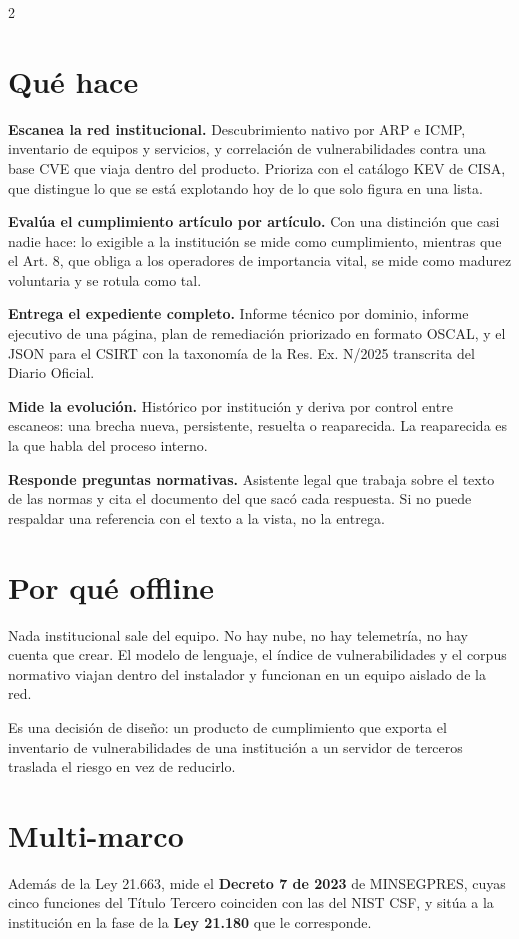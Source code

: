 \documentclass[10pt,a4paper]{article}
\begin{document}
\begin{multicols}{2}

\section{Qué hace}

\textbf{Escanea la red institucional.} Descubrimiento nativo por ARP e ICMP, inventario de
equipos y servicios, y correlación de vulnerabilidades contra una base CVE que viaja dentro
del producto. Prioriza con el catálogo KEV de CISA, que distingue lo que se está explotando
hoy de lo que solo figura en una lista.

\textbf{Evalúa el cumplimiento artículo por artículo.} Con una distinción que casi nadie
hace: lo exigible a la institución se mide como cumplimiento, mientras que el
Art. 8\textdegree, que obliga a los operadores de importancia vital, se mide como madurez
voluntaria y se rotula como tal.

\textbf{Entrega el expediente completo.} Informe técnico por dominio, informe ejecutivo de
una página, plan de remediación priorizado en formato OSCAL, y el JSON para el CSIRT con la
taxonomía de la Res. Ex. N/2025 transcrita del Diario Oficial.

\textbf{Mide la evolución.} Histórico por institución y deriva por control entre escaneos:
una brecha nueva, persistente, resuelta o reaparecida. La reaparecida es la que habla del
proceso interno.

\textbf{Responde preguntas normativas.} Asistente legal que trabaja sobre el texto de las
normas y cita el documento del que sacó cada respuesta. Si no puede respaldar una
referencia con el texto a la vista, no la entrega.

\section{Por qué offline}

Nada institucional sale del equipo. No hay nube, no hay telemetría, no hay cuenta que
crear. El modelo de lenguaje, el índice de vulnerabilidades y el corpus normativo viajan
dentro del instalador y funcionan en un equipo aislado de la red.

Es una decisión de diseño: un producto de cumplimiento que exporta el inventario de
vulnerabilidades de una institución a un servidor de terceros traslada el riesgo en vez de
reducirlo.

\section{Multi-marco}

Además de la Ley 21.663, mide el \textbf{Decreto 7 de 2023} de MINSEGPRES, cuyas cinco
funciones del Título Tercero coinciden con las del NIST CSF, y sitúa a la institución en la
fase de la \textbf{Ley 21.180} que le corresponde.

\end{multicols}
\end{document}
